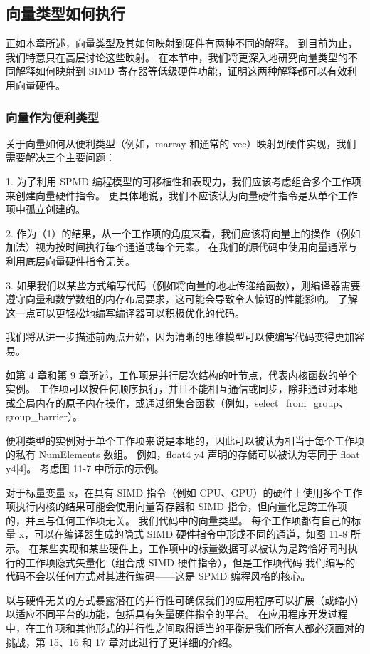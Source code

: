 \subsection{向量类型如何执行}
正如本章所述，向量类型及其如何映射到硬件有两种不同的解释。 到目前为止，我们特意只在高层讨论这些映射。 在本节中，我们将更深入地研究向量类型的不同解释如何映射到 SIMD 寄存器等低级硬件功能，证明这两种解释都可以有效利用向量硬件。

\subsubsection{向量作为便利类型}
关于向量如何从便利类型（例如，marray 和通常的 vec）映射到硬件实现，我们需要解决三个主要问题：

1. 为了利用 SPMD 编程模型的可移植性和表现力，我们应该考虑组合多个工作项来创建向量硬件指令。 更具体地说，我们不应该认为向量硬件指令是从单个工作项中孤立创建的。

2. 作为（1）的结果，从一个工作项的角度来看，我们应该将向量上的操作（例如加法）视为按时间执行每个通道或每个元素。 在我们的源代码中使用向量通常与利用底层向量硬件指令无关。

3. 如果我们以某些方式编写代码（例如将向量的地址传递给函数），则编译器需要遵守向量和数学数组的内存布局要求，这可能会导致令人惊讶的性能影响。 了解这一点可以更轻松地编写编译器可以积极优化的代码。

我们将从进一步描述前两点开始，因为清晰的思维模型可以使编写代码变得更加容易。

如第 4 章和第 9 章所述，工作项是并行层次结构的叶节点，代表内核函数的单个实例。 工作项可以按任何顺序执行，并且不能相互通信或同步，除非通过对本地或全局内存的原子内存操作，或通过组集合函数（例如，select\_from\_group、group\_barrier）。

便利类型的实例对于单个工作项来说是本地的，因此可以被认为相当于每个工作项的私有 NumElements 数组。 例如，float4 y4 声明的存储可以被认为等同于 float y4[4]。 考虑图 11-7 中所示的示例。

对于标量变量 x，在具有 SIMD 指令（例如 CPU、GPU）的硬件上使用多个工作项执行内核的结果可能会使用向量寄存器和 SIMD 指令，但向量化是跨工作项的，并且与任何工作项无关。 我们代码中的向量类型。 每个工作项都有自己的标量 x，可以在编译器生成的隐式 SIMD 硬件指令中形成不同的通道，如图 11-8 所示。 在某些实现和某些硬件上，工作项中的标量数据可以被认为是跨恰好同时执行的工作项隐式矢量化（组合成 SIMD 硬件指令），但是工作项代码 我们编写的代码不会以任何方式对其进行编码——这是 SPMD 编程风格的核心。

以与硬件无关的方式暴露潜在的并行性可确保我们的应用程序可以扩展（或缩小）以适应不同平台的功能，包括具有矢量硬件指令的平台。 在应用程序开发过程中，在工作项和其他形式的并行性之间取得适当的平衡是我们所有人都必须面对的挑战，第 15、16 和 17 章对此进行了更详细的介绍。

